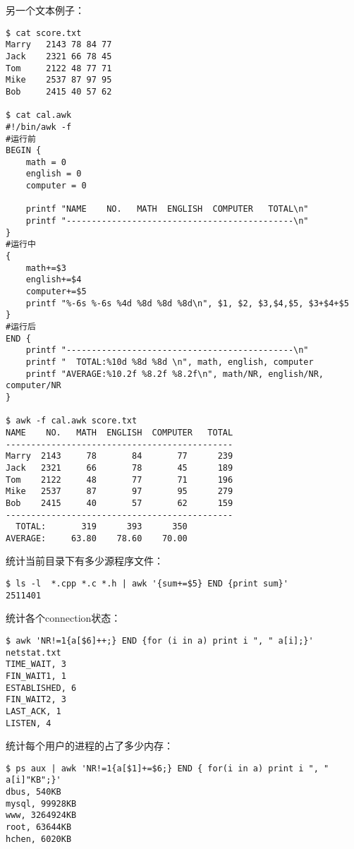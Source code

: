 另一个文本例子：
\begin{verbatim}
$ cat score.txt
Marry   2143 78 84 77
Jack    2321 66 78 45
Tom     2122 48 77 71
Mike    2537 87 97 95
Bob     2415 40 57 62

$ cat cal.awk
#!/bin/awk -f
#运行前
BEGIN {
    math = 0
    english = 0
    computer = 0

    printf "NAME    NO.   MATH  ENGLISH  COMPUTER   TOTAL\n"
    printf "---------------------------------------------\n"
}
#运行中
{
    math+=$3
    english+=$4
    computer+=$5
    printf "%-6s %-6s %4d %8d %8d %8d\n", $1, $2, $3,$4,$5, $3+$4+$5
}
#运行后
END {
    printf "---------------------------------------------\n"
    printf "  TOTAL:%10d %8d %8d \n", math, english, computer
    printf "AVERAGE:%10.2f %8.2f %8.2f\n", math/NR, english/NR, computer/NR
}

$ awk -f cal.awk score.txt
NAME    NO.   MATH  ENGLISH  COMPUTER   TOTAL
---------------------------------------------
Marry  2143     78       84       77      239
Jack   2321     66       78       45      189
Tom    2122     48       77       71      196
Mike   2537     87       97       95      279
Bob    2415     40       57       62      159
---------------------------------------------
  TOTAL:       319      393      350
AVERAGE:     63.80    78.60    70.00
\end{verbatim}

统计当前目录下有多少源程序文件：
\begin{verbatim}
$ ls -l  *.cpp *.c *.h | awk '{sum+=$5} END {print sum}'
2511401
\end{verbatim}


统计各个connection状态：
\begin{verbatim}
$ awk 'NR!=1{a[$6]++;} END {for (i in a) print i ", " a[i];}' netstat.txt
TIME_WAIT, 3
FIN_WAIT1, 1
ESTABLISHED, 6
FIN_WAIT2, 3
LAST_ACK, 1
LISTEN, 4
\end{verbatim}

统计每个用户的进程的占了多少内存：
\begin{verbatim}
$ ps aux | awk 'NR!=1{a[$1]+=$6;} END { for(i in a) print i ", " a[i]"KB";}'
dbus, 540KB
mysql, 99928KB
www, 3264924KB
root, 63644KB
hchen, 6020KB
\end{verbatim}




